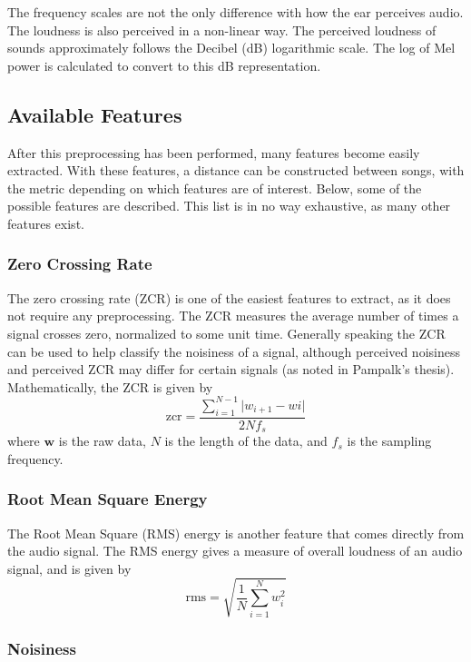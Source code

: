 \documentclass[12pt]{article}
\begin{document}
The frequency scales are not the only difference with how the ear perceives audio.  The loudness is also perceived in a non-linear way.  The perceived loudness of sounds approximately follows the Decibel (dB) logarithmic scale.  The log of Mel power is calculated to convert to this dB representation.

\subsection{Available Features}

After this preprocessing has been performed, many features become easily extracted.  With these features, a distance can be constructed between songs, with the metric depending on which features are of interest.  Below, some of the possible features are described.  This list is in no way exhaustive, as many other features exist.

\subsubsection{Zero Crossing Rate}

The zero crossing rate (ZCR) is one of the easiest features to extract, as it does not require any preprocessing.  The ZCR measures the average number of times a signal crosses zero, normalized to some unit time.  Generally speaking the ZCR can be used to help classify the noisiness of a signal, although perceived noisiness and perceived ZCR may differ for certain signals (as noted in Pampalk's thesis).  Mathematically, the ZCR is given by
$$ \text{zcr} = \frac{\sum_{i=1}^{N-1} \vert w_{i+1} - w{i} \vert}{2 N f_s} $$
where $\mathbf{w}$ is the raw data, $N$ is the length of the data, and $f_s$ is the sampling frequency.

\subsubsection{Root Mean Square Energy}

The Root Mean Square (RMS) energy is another feature that comes directly from the audio signal.  The RMS energy gives a measure of overall loudness of an audio signal, and is given by
$$ \text{rms} = \sqrt{\frac{1}{N}\sum_{i=1}^N w_i^2} $$


\subsubsection{Noisiness}
\end{document}
